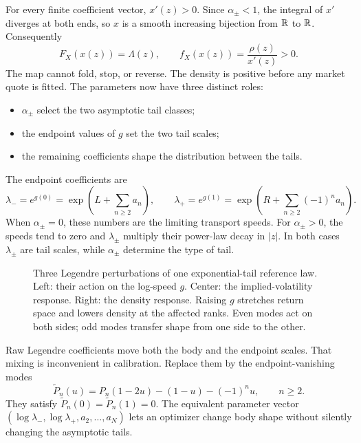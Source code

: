 For every finite coefficient vector, $x'(z)>0$.  Since $\alpha_\pm<1$, the
integral of $x'$ diverges at both ends, so $x$ is a smooth increasing
bijection from $\mathbb{R}$ to $\mathbb{R}$.  Consequently
\begin{equation}
F_X(x(z))=\Lambda(z),\qquad
f_X(x(z))=\frac{\rho(z)}{x'(z)}>0.
\label{eq:density}
\end{equation}
The map cannot fold, stop, or reverse.  The density is positive before any
market quote is fitted.  The parameters now have three distinct roles:
\begin{itemize}
\item $\alpha_\pm$ select the two asymptotic tail classes;
\item the endpoint values of $g$ set the two tail scales;
\item the remaining coefficients shape the distribution between the tails.
\end{itemize}

The endpoint coefficients are
\begin{equation}
\lambda_-=e^{g(0)}
=\exp\left(L+\sum_{n\ge2}a_n\right),\qquad
\lambda_+=e^{g(1)}
=\exp\left(R+\sum_{n\ge2}(-1)^na_n\right).
\label{eq:endpoints}
\end{equation}
When $\alpha_\pm=0$, these numbers are the limiting transport speeds.  For
$\alpha_\pm>0$, the speeds tend to zero and $\lambda_\pm$ multiply their
power-law decay in $|z|$.  In both cases $\lambda_\pm$ are tail scales, while
$\alpha_\pm$ determine the type of tail.

\begin{figure}[htbp]
\centering
{}
\caption{Three Legendre perturbations of one exponential-tail reference law.
Left: their action on the log-speed $g$.  Center: the implied-volatility
response.  Right: the density response.  Raising $g$ stretches return space
and lowers density at the affected ranks.  Even modes act on both sides; odd
modes transfer shape from one side to the other.}
\label{fig:modes}
\end{figure}

Raw Legendre coefficients move both the body and the endpoint scales.  That
mixing is inconvenient in calibration.  Replace them by the
endpoint-vanishing modes
\begin{equation}
\widetilde P_n(u)=P_n(1-2u)-(1-u)-(-1)^nu,\qquad n\ge2.
\label{eq:endpointbasis}
\end{equation}
They satisfy $\widetilde P_n(0)=\widetilde P_n(1)=0$.  The equivalent
parameter vector $(\log\lambda_-,\log\lambda_+,a_2,\ldots,a_N)$ lets an
optimizer change body shape without silently changing the asymptotic tails.

